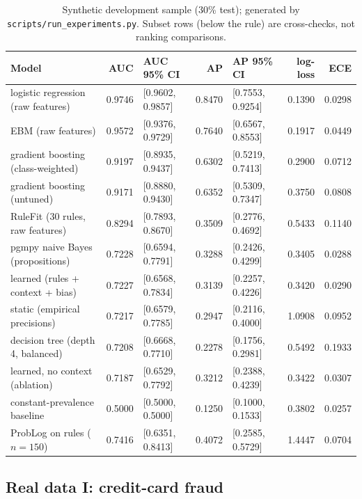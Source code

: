 \begin{table}[t]
\centering
\caption{Synthetic development sample (30\% test); generated by
\texttt{scripts/run\_experiments.py}. Subset rows (below the rule) are
cross-checks, not ranking comparisons.}
\label{tab:headtohead}
{\scriptsize
\setlength{\tabcolsep}{3.5pt}
\begin{tabular}{lrlrlrr}
\toprule
Model & AUC & AUC 95\% CI & AP & AP 95\% CI & log-loss & ECE\\
\midrule
logistic regression (raw features) & 0.9746 & [0.9602, 0.9857] & 0.8470 & [0.7553, 0.9254] & 0.1390 & 0.0298\\
EBM (raw features) & 0.9572 & [0.9376, 0.9729] & 0.7640 & [0.6567, 0.8553] & 0.1917 & 0.0449\\
gradient boosting (class-weighted) & 0.9197 & [0.8935, 0.9437] & 0.6302 & [0.5219, 0.7413] & 0.2900 & 0.0712\\
gradient boosting (untuned) & 0.9171 & [0.8880, 0.9430] & 0.6352 & [0.5309, 0.7347] & 0.3750 & 0.0808\\
RuleFit (30 rules, raw features) & 0.8294 & [0.7893, 0.8670] & 0.3509 & [0.2776, 0.4692] & 0.5433 & 0.1140\\
pgmpy naive Bayes (propositions) & 0.7228 & [0.6594, 0.7791] & 0.3288 & [0.2426, 0.4299] & 0.3405 & 0.0288\\
\pla{} learned (rules + context + bias) & 0.7227 & [0.6568, 0.7834] & 0.3139 & [0.2257, 0.4226] & 0.3420 & 0.0290\\
\pla{} static (empirical precisions) & 0.7217 & [0.6579, 0.7785] & 0.2947 & [0.2116, 0.4000] & 1.0908 & 0.0952\\
decision tree (depth 4, balanced) & 0.7208 & [0.6668, 0.7710] & 0.2278 & [0.1756, 0.2981] & 0.5492 & 0.1933\\
\pla{} learned, no context (ablation) & 0.7187 & [0.6529, 0.7792] & 0.3212 & [0.2388, 0.4239] & 0.3422 & 0.0307\\
constant-prevalence baseline & 0.5000 & [0.5000, 0.5000] & 0.1250 & [0.1000, 0.1533] & 0.3802 & 0.0257\\
\midrule
ProbLog on \pla{} rules ($n{=}150$) & 0.7416 & [0.6351, 0.8413] & 0.4072 & [0.2585, 0.5729] & 1.4447 & 0.0704\\
\bottomrule
\end{tabular}}
\end{table}

\subsection{Real data I: credit-card fraud}

